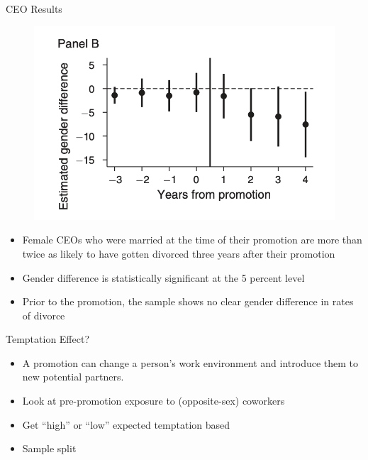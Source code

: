 \documentclass[11pt,notes=hide,aspectratio=169,mathserif]{beamer}
\begin{document}
\begin{frame}{CEO Results}
\small
\begin{figure}
  \centering
  \includegraphics[width=0.5\linewidth]{inputs/fig5.png}
  \end{figure}
\begin{itemize}
  \item Female CEOs who were married at the time of their promotion are more than twice
  as likely to have gotten divorced three years after their promotion
  \item Gender difference is statistically significant at the 5 percent level
  \item Prior to the promotion, the sample shows
  no clear gender difference in rates of divorce
\end{itemize}
\end{frame}

\begin{frame}{Temptation Effect?}
\small
\begin{itemize}
  \item A promotion can change a person’s work environment and introduce them to
  new  potential partners.
  \item Look at pre-promotion exposure to (opposite-sex) coworkers 
  \item Get ``high'' or ``low'' expected temptation based 
  \item Sample split 
\end{itemize}
\end{frame}
\end{document}
